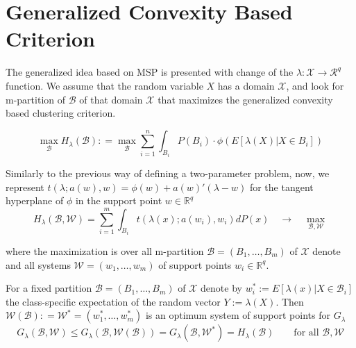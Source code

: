 \documentclass{article}
\begin{document}
\section{Generalized Convexity Based Criterion}

The generalized idea based on MSP is presented with change of the $\lambda: \mathcal X \to \mathcal R^q$ function. We assume that the random variable $X$ has a domain $\mathcal X$, and look for m-partition of $\mathcal B$ of that domain $\mathcal X$ that maximizes the generalized convexity based clustering criterion.

\begin{equation}
	\max_{\mathcal B} H_{\lambda}(\mathcal B) : = \max_{\mathcal B}\sum_{i=1}^n \int_{B_i} P(B_i) \cdot \phi(E[\lambda(X)|X\in B_i])
\end{equation}

Similarly to the previous way of defining a two-parameter problem, now, we represent $t(\lambda; a(w), w) = \phi(w) + a(w)'(\lambda - w)$ for the tangent hyperplane of $\phi$ in the support point $w\in \mathbb R^q$
\begin{equation}
	H_\lambda(\mathcal B, \mathcal W)= \sum_{i=1}^m \int_{B_i} t(\lambda(x); a(w_i), w_i) dP(x) \quad\rightarrow \quad \max_{\mathcal B, \mathcal W}
\end{equation}


where the maximization is over all m-partition $\mathcal B = (B_1, \ldots, B_m)$ of $\mathcal X$ denote and all systems $\mathcal W=(w_1,\ldots,w_m)$ of support points $w_i \in \mathbb R^q$.


\begin{tcolorbox}[coltitle= black!80, colframe=red!35, colback=red!10 ,title=\textbf{Theorem:  W(B) is the system that maximize G(B,W)}]
For a fixed partition $\mathcal B = (B_1, \ldots, B_m)$ of $\mathcal X$ denote by $w_i^* := E[\lambda(x) | X\in \mathcal B_i]$ the class-specific expectation of the random vector $Y:=\lambda(X)$. Then $\mathcal W(\mathcal B): = \mathcal W^* = (w_1^*, \ldots , w_m^*)$ is an optimum system of support points for $G_\lambda$
\vspace{-2mm}
\begin{equation}
	G_\lambda(\mathcal B, \mathcal W) \le G_\lambda (\mathcal B, \mathcal W(\mathcal B)) = G_\lambda(\mathcal B, \mathcal W^*) = H_\lambda(\mathcal B) \quad\quad \text{for all } \mathcal B, \mathcal W
\end{equation}
\end{tcolorbox}
\end{document}
